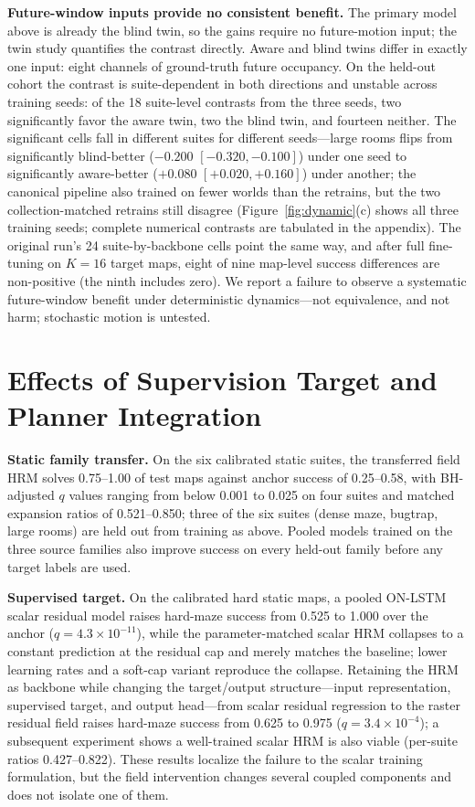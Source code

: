 \documentclass[letterpaper]{article} %
\begin{document}
\textbf{Future-window inputs provide no consistent benefit.} The primary model above is already the blind twin, so the gains require no future-motion input; the twin study quantifies the contrast directly. Aware and blind twins differ in exactly one input: eight channels of ground-truth future occupancy. On the held-out cohort the contrast is suite-dependent in both directions and unstable across training seeds: of the 18 suite-level contrasts from the three seeds, two significantly favor the aware twin, two the blind twin, and fourteen neither. The significant cells fall in different suites for different seeds---large rooms flips from significantly blind-better ($-0.200$ $[-0.320,-0.100]$) under one seed to significantly aware-better ($+0.080$ $[+0.020,+0.160]$) under another; the canonical pipeline also trained on fewer worlds than the retrains, but the two collection-matched retrains still disagree (Figure~\ref{fig:dynamic}(c) shows all three training seeds; complete numerical contrasts are tabulated in the appendix). The original run's 24 suite-by-backbone cells point the same way, and after full fine-tuning on $K{=}16$ target maps, eight of nine map-level success differences are non-positive (the ninth includes zero). We report a failure to observe a systematic future-window benefit under deterministic dynamics---not equivalence, and not harm; stochastic motion is untested.

\section{Effects of Supervision Target and Planner Integration}

\textbf{Static family transfer.} On the six calibrated static suites, the transferred field HRM solves 0.75--1.00 of test maps against anchor success of 0.25--0.58, with BH-adjusted $q$ values ranging from below 0.001 to 0.025 on four suites and matched expansion ratios of 0.521--0.850; three of the six suites (dense maze, bugtrap, large rooms) are held out from training as above. Pooled models trained on the three source families also improve success on every held-out family before any target labels are used.

\textbf{Supervised target.} On the calibrated hard static maps, a pooled ON-LSTM scalar residual model raises hard-maze success from 0.525 to 1.000 over the anchor ($q=4.3\times10^{-11}$), while the parameter-matched scalar HRM collapses to a constant prediction at the residual cap and merely matches the baseline; lower learning rates and a soft-cap variant reproduce the collapse. Retaining the HRM as backbone while changing the target/output structure---input representation, supervised target, and output head---from scalar residual regression to the raster residual field raises hard-maze success from 0.625 to 0.975 ($q=3.4\times10^{-4}$); a subsequent experiment shows a well-trained scalar HRM is also viable (per-suite ratios 0.427--0.822). These results localize the failure to the scalar training formulation, but the field intervention changes several coupled components and does not isolate one of them.
\end{document}
